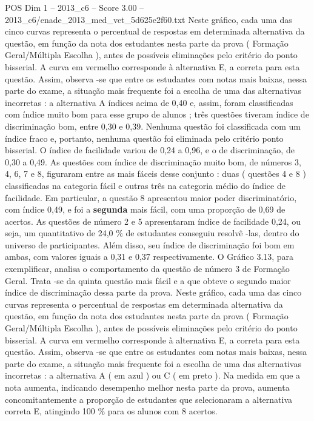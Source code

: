 \begin{textsample}{POS Dim 1 – 2013\_c6 – Score 3.00 – 2013\_c6/enade\_2013\_med\_vet\_5d625e2f60.txt}
Neste gráfico, cada uma das cinco curvas representa o percentual de respostas em determinada alternativa da questão, em função da nota dos estudantes nesta parte da prova ( Formação Geral/Múltipla Escolha ), antes de possíveis eliminações pelo critério do ponto bisserial.
A curva em vermelho corresponde à alternativa E, a correta para esta questão.
Assim, observa -se que entre os estudantes com notas mais baixas, nessa parte do exame, a situação mais frequente foi a escolha de uma das alternativas incorretas : a alternativa A índices acima de 0,40 e, assim, foram classificadas com índice muito bom para esse grupo de alunos ; três questões tiveram índice de discriminação bom, entre 0,30 e 0,39.
Nenhuma questão foi classificada com um índice fraco e, portanto, nenhuma questão foi eliminada pelo critério ponto bisserial.
O índice de facilidade variou de 0,24 a 0,96, e o de discriminação, de 0,30 a 0,49.
As questões com índice de discriminação muito bom, de números 3, 4, 6, 7 e 8, figuraram entre as mais fáceis desse conjunto : duas ( questões 4 e 8 ) classificadas na categoria fácil e outras três na categoria médio do índice de facilidade.
Em particular, a questão 8 apresentou maior poder discriminatório, com índice 0,49, e foi a \textbf{segunda} mais fácil, com uma proporção de 0,69 de acertos.
As questões de número 2 e 5 apresentaram índice de facilidade 0,24, ou seja, um quantitativo de 24,0 \% de estudantes conseguiu resolvê -las, dentro do universo de participantes.
Além disso, seu índice de discriminação foi bom em ambas, com valores iguais a 0,31 e 0,37 respectivamente.
O Gráfico 3.13, para exemplificar, analisa o comportamento da questão de número 3 de Formação Geral.
Trata -se da quinta questão mais fácil e a que obteve o segundo maior índice de discriminação dessa parte da prova.
Neste gráfico, cada uma das cinco curvas representa o percentual de respostas em determinada alternativa da questão, em função da nota dos estudantes nesta parte da prova ( Formação Geral/Múltipla Escolha ), antes de possíveis eliminações pelo critério do ponto bisserial.
A curva em vermelho corresponde à alternativa E, a correta para esta questão.
Assim, observa -se que entre os estudantes com notas mais baixas, nessa parte do exame, a situação mais frequente foi a escolha de uma das alternativas incorretas : a alternativa A ( em azul ) ou C ( em preto ).
Na medida em que a nota aumenta, indicando desempenho melhor nesta parte da prova, aumenta concomitantemente a proporção de estudantes que selecionaram a alternativa correta E, atingindo 100 \% para os alunos com 8 acertos.

\end{textsample}
